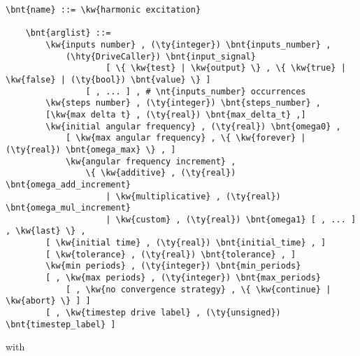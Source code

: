 \begin{Verbatim}[commandchars=\\\{\}]
    \bnt{name} ::= \kw{harmonic excitation}

    \bnt{arglist} ::=
        \kw{inputs number} , (\ty{integer}) \bnt{inputs_number} ,
            (\hty{DriveCaller}) \bnt{input_signal}
                    [ \{ \kw{test} | \kw{output} \} , \{ \kw{true} | \kw{false} | (\ty{bool}) \bnt{value} \} ]
                [ , ... ] , # \nt{inputs_number} occurrences
        \kw{steps number} , (\ty{integer}) \bnt{steps_number} ,
        [\kw{max delta t} , (\ty{real}) \bnt{max_delta_t} ,]
        \kw{initial angular frequency} , (\ty{real}) \bnt{omega0} ,
            [ \kw{max angular frequency} , \{ \kw{forever} | (\ty{real}) \bnt{omega_max} \} , ]
            \kw{angular frequency increment} ,
                \{ \kw{additive} , (\ty{real}) \bnt{omega_add_increment}
                    | \kw{multiplicative} , (\ty{real}) \bnt{omega_mul_increment}
                    | \kw{custom} , (\ty{real}) \bnt{omega1} [ , ... ] , \kw{last} \} ,
        [ \kw{initial time} , (\ty{real}) \bnt{initial_time} , ]
        [ \kw{tolerance} , (\ty{real}) \bnt{tolerance} , ]
        \kw{min periods} , (\ty{integer}) \bnt{min_periods}
        [ , \kw{max periods} , (\ty{integer}) \bnt{max_periods}
            [ , \kw{no convergence strategy} , \{ \kw{continue} | \kw{abort} \} ] ]
        [ , \kw{timestep drive label} , (\ty{unsigned}) \bnt{timestep_label} ]
\end{Verbatim}
with
